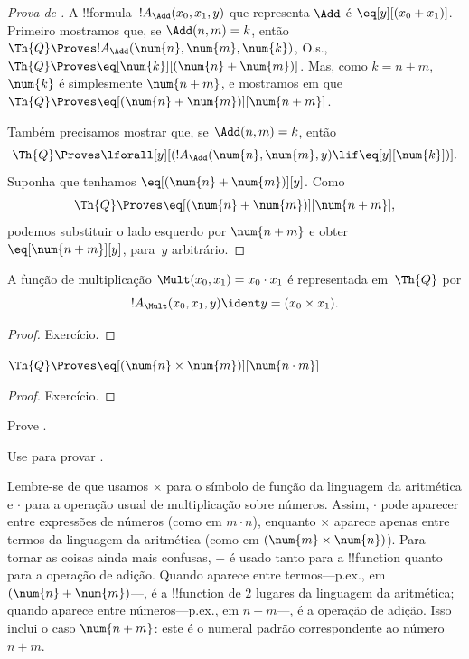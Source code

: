 \documentclass[../../../include/open-logic-section]{subfiles}
\begin{document}
\begin{proof}[Prova de ]
A !!{formula}~$!A_\Add(x_0, x_1, y)$ que representa $\Add$ é
$\eq[y][(x_0 + x_1)]$. Primeiro mostramos que, se $\Add(n, m) = k$, então
$\Th{Q} \Proves !A_\Add(\num{n}, \num{m}, \num{k})$, O.s.\@, $\Th{Q}
\Proves \eq[\num{k}][(\num{n} + \num{m})]$. Mas, como $k = n + m$,
$\num{k}$ é simplesmente $\num{n+m}$, e mostramos em
 que $\Th{Q} \Proves \eq[(\num{n} +
  \num{m})][\num{n+m}]$.

Também precisamos mostrar que, se $\Add(n, m) = k$, então
\[
\Th{Q} \Proves \lforall[y][(!A_\Add(\num{n}, \num{m}, y) \lif
  \eq[y][\num{k}])].
\]
Suponha que tenhamos $\eq[(\num{n} + \num{m})][y]$. Como
\[
\Th{Q} \Proves \eq[(\num{n}+\num{m})][\num{n+m}],
\]
podemos substituir o lado esquerdo por $\num{n+m}$ e obter
$\eq[\num{n+m}][y]$, para~$y$ arbitrário.
\end{proof}

\begin{prop}
A função de multiplicação $\Mult(x_0, x_1) = x_0 \cdot x_1$ é
representada em~$\Th{Q}$ por
\[
  !A_{\Mult}(x_0, x_1, y) \ident y = (x_0 \times x_1).
\]
\end{prop}

\begin{proof} Exercício. \end{proof}

\begin{lem}
$\Th{Q} \Proves \eq[(\num{n} \times \num{m})][\num{n \cdot m}]$
\end{lem}

\begin{proof} Exercício. \end{proof}

\begin{prob}
Prove .
\end{prob}

\begin{prob}
Use  para provar
.
\end{prob}

\begin{explain}
  Lembre-se de que usamos $\times$ para o símbolo de função da
  linguagem da aritmética e $\cdot$ para a operação usual de
  multiplicação sobre números. Assim, $\cdot$ pode aparecer entre
  expressões de números (como em $m \cdot n$), enquanto $\times$
  aparece apenas entre termos da linguagem da aritmética (como em
  $(\num{m} \times \num{n})$). Para tornar as coisas ainda mais
  confusas, $+$ é usado tanto para a !!{function} quanto para a
  operação de adição. Quando aparece entre termos---p.ex., em
  $(\num{n} + \num{m})$---, é a !!{function} de $2$ lugares da
  linguagem da aritmética; quando aparece entre números---p.ex.,
  em $n+m$---, é a operação de adição. Isso inclui o caso
  $\num{n+m}$: este é o numeral padrão correspondente ao número~$n+m$.
\end{explain}
\end{document}

